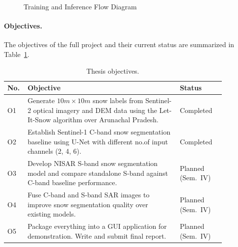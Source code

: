 \documentclass{article}
\begin{document}
\begin{figure}[!htbp]
  \vspace{-4pt}
  \caption{Training and Inference Flow Diagram}
  \label{fig:concept}
\end{figure}

\paragraph{Objectives.}
The objectives of the full project and their current status are summarized in Table~\ref{tab:objectives}.

\begin{table}[!htbp]
  \caption{Thesis objectives.}
  \label{tab:objectives}
  \centering
  \small
  \begin{tabular}{p{0.05\linewidth}p{0.64\linewidth}p{0.19\linewidth}}
    \toprule
    No. & Objective & Status \\
    \midrule
    O1 & Generate $10m \times 10m$ snow labels from Sentinel-2 optical imagery and DEM data using the Let-It-Snow algorithm over Arunachal Pradesh. & Completed \\
    O2 & Establish Sentinel-1 C-band snow segmentation baseline using U-Net with different no.of input channels (2, 4, 6). & Completed \\
    O3 & Develop NISAR S-band snow segmentation model and compare standalone S-band against C-band baseline performance. & Planned (Sem.~IV) \\
    O4 & Fuse C-band and S-band SAR images to improve snow segmentation quality over existing models. & Planned (Sem.~IV) \\
    O5 & Package everything into a GUI application for demonstration. Write and submit final report. & Planned (Sem.~IV) \\
    \bottomrule
  \end{tabular}
\end{table}
\end{document}
